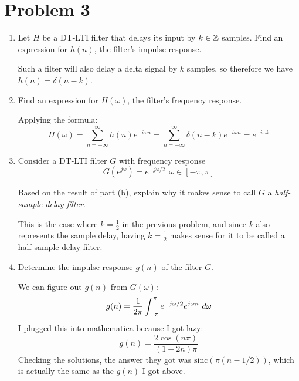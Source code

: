 \documentclass[10pt]{article}
\newcommand{\sinc}{\mathrm{sinc}}
\begin{document}
	\section*{Problem 3}
	\begin{enumerate}[label=\alph*)]
		\item Let \( H \) be a DT-LTI filter that delays its input by \( k \in \mathbb Z \) samples. Find an expression for 
			\( h(n) \), the filter's impulse response. 

			\begin{solution}
				Such a filter will also delay a delta signal by \( k \) samples, so therefore we have 
				\( h(n) = \delta(n - k) \). 
			\end{solution}
		\item Find an expression for \( H(\omega) \), the filter's frequency response. 

			\begin{solution}
				Applying the formula:
				\[
				H(\omega) = \sum_{n=-\infty}^{\infty} h(n)e^{-i \omega n} = \sum_{n=-\infty}^{\infty} 
				\delta(n - k) e^{-i \omega n} = e^{-i \omega k}
				\] 
			\end{solution}
		\item Consider a DT-LTI filter \( G \) with frequency response 
			\[
				G(e^{j \omega}) = e^{-j \omega / 2} \ \ \omega \in [-\pi, \pi]
			\] 

			Based on the result of part (b), explain why it makes sense to call \( G \) a \textit{half-sample delay 
			filter}.

			\begin{solution}
				This is the case where \( k = \frac{1}{2} \) in the previous problem, and since \( k \) also 
				represents the sample delay, having \( k = \frac{1}{2} \) makes sense for it to be called 
				a half sample delay filter. 
			\end{solution}
		\item Determine the impulse response \( g(n) \) of the filter \( G \).

			\begin{solution}
				We can figure out \( g(n) \) from \( G(\omega) \):
				\[
					g(n) = \frac{1}{2\pi}\int_{-\pi}^{\pi} e^{-j \omega / 2} e^{j \omega n} \ d \omega 
				\]
				I plugged this into mathematica because I got lazy: 
				\[
				g(n) = \frac{2 \cos(n \pi)}{(1 - 2n) \pi}
				\] 
				Checking the solutions, the answer they got was \( \sinc(\pi(n - 1/2)) \), which is actually 
				the same as the \( g(n) \) I got above. 
			\end{solution}
	\end{enumerate}
\end{document}
